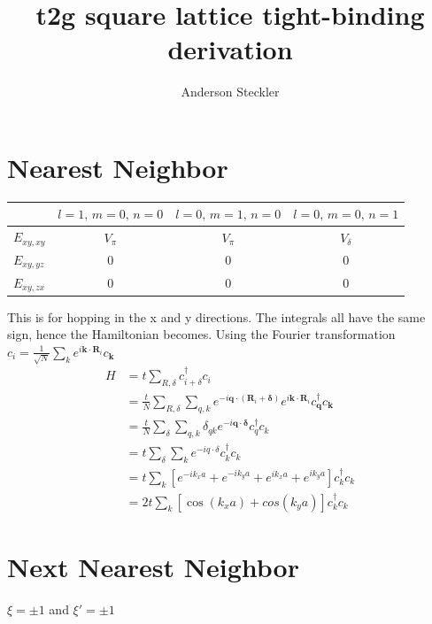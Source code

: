 \documentclass[11pt]{article}
\title{t2g square lattice tight-binding derivation}
\author{Anderson Steckler}
\date{}
\begin{document}
\maketitle

\section*{Nearest Neighbor}
 
\begin{table}[h]
\centering
\begin{tabular}{lccc}
\toprule
 & $l=1,\,m=0,\,n=0$ & $l=0,\,m=1,\,n=0$ & $l=0,\,m=0,\,n=1$ \\
\midrule
$E_{xy,xy}$ & $V_\pi$  & $V_\pi$  & $V_\delta$ \\
$E_{xy,yz}$ & $0$      & $0$      & $0$ \\
$E_{xy,zx}$ & $0$      & $0$      & $0$ \\
\bottomrule
\end{tabular}
\end{table}

This is for hopping in the x and y directions. The integrals all have the same sign,
hence the Hamiltonian becomes.
Using the Fourier transformation
$c_i = \frac{1}{\sqrt{N}} \sum_k e^{i \bm k \cdot \bm R_i} c_{\bm k}$
\begin{align}
    H &= t \sum_{R, \delta} c_{i+\delta}^\dagger c_i \\\nonumber
    &= \frac{t}{N} \sum_{R, \delta} \sum_{q, k} e^{-i \bm q \cdot (\bm R_i + \bm \delta)} e^{i \bm k \cdot \bm R_i} c_{\bm q}^\dagger c_{\bm k} \\\nonumber
    &= \frac{t}{N} \sum_\delta \sum_{q, k} \delta_{qk} e^{-i \bm q \cdot \bm \delta} c_q^\dagger c_k \\\nonumber
    &= t \sum_\delta \sum_k e^{-i q \cdot \delta} c_k^\dagger c_k \\\nonumber
    &= t\sum_k \left[e^{-ik_x a} + e^{-ik_y a} + e^{ik_x a} + e^{ik_y a}\right]c_k^\dagger c_k \\\nonumber
    &= 2t \sum_k \left[\cos(k_x a) + cos(k_y a)\right]c_k^\dagger c_k
\end{align}
 
\section*{Next Nearest Neighbor}
 
$\xi = \pm 1$ and $\xi' = \pm 1$
 
\end{document}
